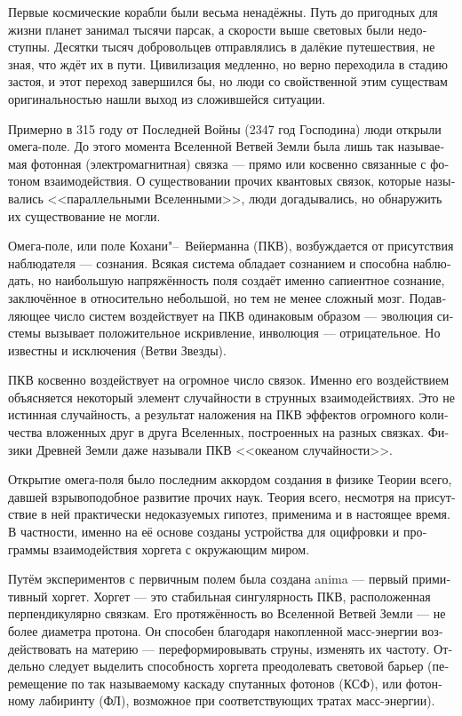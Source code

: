 \documentclass[a4paper,12pt,fleqn]{book}\usepackage{polyglossia}\setdefaultlanguage[babelshorthands=true]{russian}\setotherlanguage{english}\defaultfontfeatures{Ligatures=TeX,Mapping=tex-text}\usepackage{xcolor}\newcommand{\ml}[3]{#2}
\begin{document}
{Первые космические корабли были весьма ненадёжны.
Путь до пригодных для жизни планет занимал тысячи парсак, а скорости выше световых были недоступны.
Десятки тысяч добровольцев отправлялись в далёкие путешествия, не зная, что ждёт их в пути.
Цивилизация медленно, но верно переходила в стадию застоя, и этот переход завершился бы, но люди со свойственной этим существам оригинальностью нашли выход из сложившейся ситуации.

Примерно в 315 году от Последней Войны (2347 год Господина) люди открыли омега-поле.
До этого момента Вселенной Ветвей Земли была лишь так называемая фотонная (электромагнитная) связка --- прямо или косвенно связанные с фотоном взаимодействия.
О существовании прочих квантовых связок, которые назывались <<параллельными Вселенными>>, люди догадывались, но обнаружить их существование не могли.

Омега-поле, или поле Кохани"--~Вейерманна (ПКВ), возбуждается от присутствия наблюдателя --- сознания.
Всякая система обладает сознанием и способна наблюдать, но наибольшую напряжённость поля создаёт именно сапиентное сознание, заключённое в относительно небольшой, но тем не менее сложный мозг.
Подавляющее число систем воздействует на ПКВ одинаковым образом --- эволюция системы вызывает положительное искривление, инволюция --- отрицательное.
Но известны и исключения (Ветви Звезды).

ПКВ косвенно воздействует на огромное число связок.
Именно его воздействием объясняется некоторый элемент случайности в струнных взаимодействиях.
Это не истинная случайность, а результат наложения на ПКВ эффектов огромного количества вложенных друг в друга Вселенных, построенных на разных связках.
Физики Древней Земли даже называли ПКВ <<океаном случайности>>.

Открытие омега-поля было последним аккордом создания в физике Теории всего, давшей взрывоподобное развитие прочих наук.
Теория всего, несмотря на присутствие в ней практически недоказуемых гипотез, применима и в настоящее время.
В частности, именно на её основе созданы устройства для оцифровки и программы взаимодействия хоргета с окружающим миром.

Путём экспериментов с первичным полем была создана anima --- первый примитивный хоргет.
Хоргет --- это стабильная сингулярность ПКВ, расположенная перпендикулярно связкам.
Его протяжённость во Вселенной Ветвей Земли --- не более диаметра протона.
Он способен благодаря накопленной масс-энергии воздействовать на материю --- переформировывать струны, изменять их частоту.
Отдельно следует выделить способность хоргета преодолевать световой барьер (перемещение по так называемому каскаду спутанных фотонов (КСФ), или фотонному лабиринту (ФЛ), возможное при соответствующих тратах масс-энергии).

}
\end{document}
